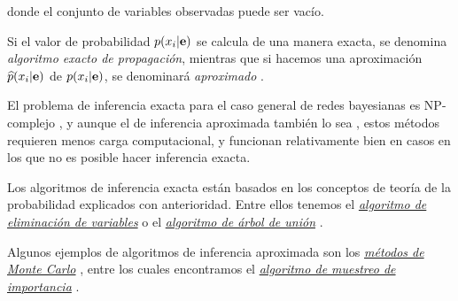 donde el conjunto de variables observadas puede ser vacío.

Si el valor de probabilidad $p(x_i|{\bf e})$ se calcula de una manera exacta, se denomina {\em algoritmo exacto 
de propagación}, mientras que si hacemos una aproximación $\widehat p(x_i|{\bf e})$ de $p(x_i|{\bf e})$, se 
denominará {\em aproximado} \cite{Cano2004}.

El problema de inferencia exacta para el caso general de redes bayesianas es NP-complejo \cite{Cooper}, y 
aunque el de inferencia aproximada también lo sea \cite{Dagum}, estos métodos requieren menos 
carga computacional, y funcionan relativamente bien en casos en los que no es posible hacer inferencia exacta.

Los algoritmos de inferencia exacta \cite {ECastillo, pearl88} están basados en los conceptos de teoría 
de la probabilidad explicados con anterioridad. Entre ellos tenemos el \href{https://ermongroup.github.io/cs228-notes/inference/ve/}{\em 
algoritmo de eliminación de variables} o el \href{https://mjtsai1974.github.io/DevBlog/2018/10/14/bayesian-ml-clique-tree-construction/}{\em 
algoritmo de árbol de unión} \cite{clique-tree}. 

Algunos ejemplos de algoritmos de inferencia aproximada son los 
\href{http://www.sc.ehu.es/sbweb/fisica_/numerico/montecarlo/montecarlo.html}{\em métodos de Monte 
Carlo} \cite{Cano2004}, entre los cuales encontramos el \href{https://github.com/topics/importance-sampling}{\em 
algoritmo de muestreo de importancia} \cite{martinez}. 



